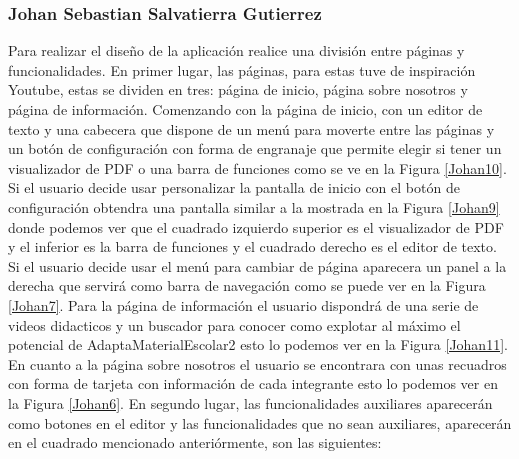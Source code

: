 \subsubsection{Johan Sebastian Salvatierra Gutierrez}
Para realizar el diseño de la aplicación realice una división entre páginas y funcionalidades. 
En primer lugar, las páginas, para estas tuve de inspiración Youtube, estas se dividen en tres: página de inicio, página sobre nosotros y página de información. Comenzando con la página de inicio, con un editor de texto y una cabecera que dispone de un menú para moverte entre las páginas y un botón de configuración con forma de engranaje que permite elegir si tener un visualizador de PDF o una barra de funciones como se ve en la Figura \ref{Johan10}. Si el usuario decide usar personalizar la pantalla de inicio con el botón de configuración obtendra una pantalla similar a la mostrada en la Figura \ref{Johan9} donde podemos ver que el cuadrado izquierdo superior es el visualizador de PDF y el inferior es la barra de funciones y el cuadrado derecho es el editor de texto. Si el usuario decide usar el menú para cambiar de página aparecera un panel a la derecha que servirá como barra de navegación como se puede ver en la Figura \ref{Johan7}. Para la página de información el usuario dispondrá de una serie de videos didacticos y un buscador para conocer como explotar al máximo el potencial de AdaptaMaterialEscolar2 esto lo podemos ver en la Figura \ref{Johan11}. En cuanto a la página sobre nosotros el usuario se encontrara con unas recuadros con forma de tarjeta con información de cada integrante esto lo podemos ver en la Figura \ref{Johan6}.
En segundo lugar, las funcionalidades auxiliares aparecerán  como botones en el editor y las funcionalidades que no sean auxiliares, aparecerán en el cuadrado mencionado anteriórmente, son las siguientes:
